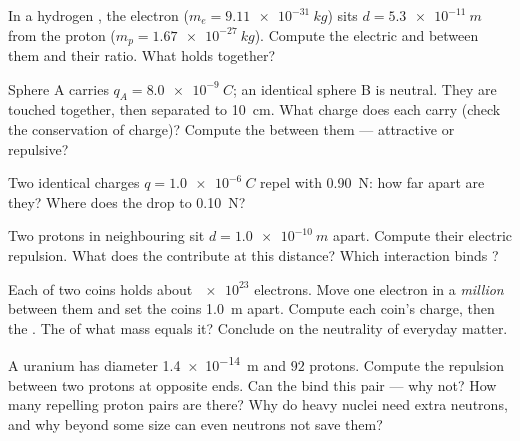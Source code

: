 \begin{exercise}[$\star\star$]\label{exo:g11:fundamental-interactions:7}
In a hydrogen , the electron ($m_e = \qty{9.11e-31}{kg}$) sits
$d = \qty{5.3e-11}{m}$ from the proton ($m_p = \qty{1.67e-27}{kg}$).
Compute the electric and  between them and their
ratio. What holds  together?
\end{exercise}

\begin{exercise}[$\star\star$]\label{exo:g11:fundamental-interactions:8}
Sphere A carries $q_A = \qty{+8.0e-9}{C}$; an identical sphere B is
neutral. They are touched together, then separated to \qty{10}{cm}.
What charge does each carry (check the conservation of charge)? Compute
the  between them --- attractive or repulsive?
\end{exercise}

\begin{exercise}[$\star\star$]\label{exo:g11:fundamental-interactions:9}
Two identical charges $q = \qty{1.0e-6}{C}$ repel with \qty{0.90}{N}:
how far apart are they? Where does the  drop to \qty{0.10}{N}?
\end{exercise}

\begin{exercise}[$\star\star$]\label{exo:g11:fundamental-interactions:10}
Two protons in neighbouring  sit $d = \qty{1.0e-10}{m}$ apart.
Compute their electric repulsion. What does the 
contribute at this distance? Which interaction binds ?
\end{exercise}

\begin{exercise}[$\star\star$]\label{exo:g11:fundamental-interactions:11}
Each of two coins holds about $\num{e23}$ electrons. Move one electron
in a \emph{million} between them and set the coins \qty{1.0}{m} apart.
Compute each coin's charge, then the . The  of what mass
equals it? Conclude on the neutrality of everyday matter.
\end{exercise}

\begin{exercise}[$\star\star\star$]\label{exo:g11:fundamental-interactions:12}
A uranium  has diameter \qty{1.4e-14}{m} and $92$ protons.
Compute the repulsion between two protons at opposite ends. Can the
 bind this pair --- why not? How many repelling
proton pairs are there? Why do heavy nuclei need extra neutrons, and
why beyond some size can even neutrons not save them?
\end{exercise}

